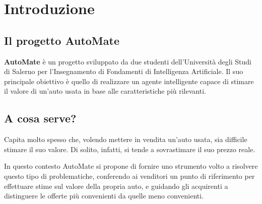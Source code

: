 \chapter{Introduzione}
\section{Il progetto AutoMate}
\textbf{AutoMate} è un progetto sviluppato da due studenti dell'Università degli Studi di Salerno 
per l'Insegnamento di Fondamenti di Intelligenza Artificiale. 
Il suo principale obiettivo è quello di realizzare un agente intelligente capace di stimare il valore 
di un'auto usata in base alle caratteristiche più rilevanti.
\medskip
\section{A cosa serve?}
Capita molto spesso che, volendo mettere in vendita un'auto usata, sia difficile stimare il suo valore. 
Di solito, infatti, si tende a sovrastimare il suo prezzo reale.

In questo contesto AutoMate si propone di fornire uno strumento volto a risolvere questo tipo di 
problematiche, conferendo ai venditori un punto di riferimento per effettuare stime sul valore della 
propria auto, e guidando gli acquirenti a distinguere le offerte più convenienti da quelle meno convenienti.
